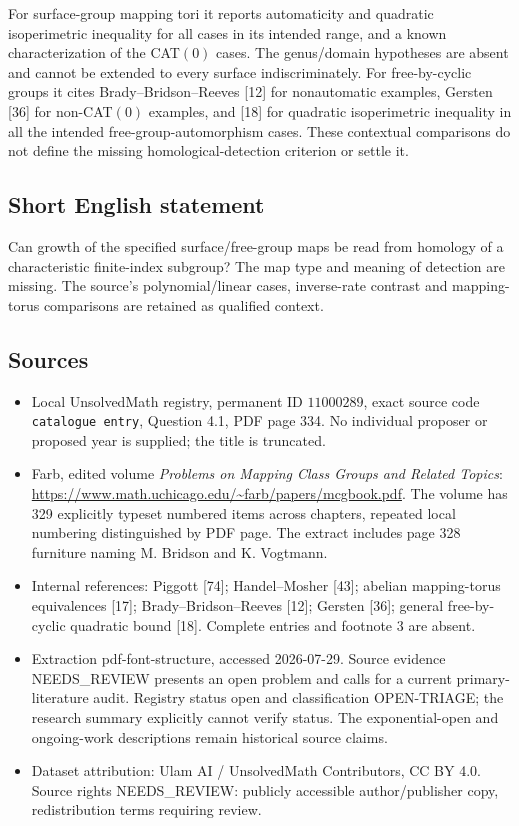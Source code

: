 \documentclass[11pt]{article}
\begin{document}
For surface-group mapping tori it reports automaticity and quadratic isoperimetric inequality for all cases in its intended range, and a known characterization of the CAT\((0)\) cases. The genus/domain hypotheses are absent and cannot be extended to every surface indiscriminately. For free-by-cyclic groups it cites Brady--Bridson--Reeves [12] for nonautomatic examples, Gersten [36] for non-CAT\((0)\) examples, and [18] for quadratic isoperimetric inequality in all the intended free-group-automorphism cases. These contextual comparisons do not define the missing homological-detection criterion or settle it.
\subsection{Short English statement}
Can growth of the specified surface/free-group maps be read from homology of a characteristic finite-index subgroup? The map type and meaning of detection are missing. The source's polynomial/linear cases, inverse-rate contrast and mapping-torus comparisons are retained as qualified context.
\subsection{Sources}
\begin{itemize}
\item Local UnsolvedMath registry, permanent ID \(11000289\), exact source code \texttt{catalogue entry}, Question 4.1, PDF page 334. No individual proposer or proposed year is supplied; the title is truncated.
\item Farb, edited volume \emph{Problems on Mapping Class Groups and Related Topics}: \url{https://www.math.uchicago.edu/~farb/papers/mcgbook.pdf}. The volume has 329 explicitly typeset numbered items across chapters, repeated local numbering distinguished by PDF page. The extract includes page 328 furniture naming M. Bridson and K. Vogtmann.
\item Internal references: Piggott [74]; Handel--Mosher [43]; abelian mapping-torus equivalences [17]; Brady--Bridson--Reeves [12]; Gersten [36]; general free-by-cyclic quadratic bound [18]. Complete entries and footnote 3 are absent.
\item Extraction pdf-font-structure, accessed 2026-07-29. Source evidence NEEDS\_REVIEW presents an open problem and calls for a current primary-literature audit. Registry status open and classification OPEN-TRIAGE; the research summary explicitly cannot verify status. The exponential-open and ongoing-work descriptions remain historical source claims.
\item Dataset attribution: Ulam AI / UnsolvedMath Contributors, CC BY 4.0. Source rights NEEDS\_REVIEW: publicly accessible author/publisher copy, redistribution terms requiring review.
\end{itemize}
\end{document}
